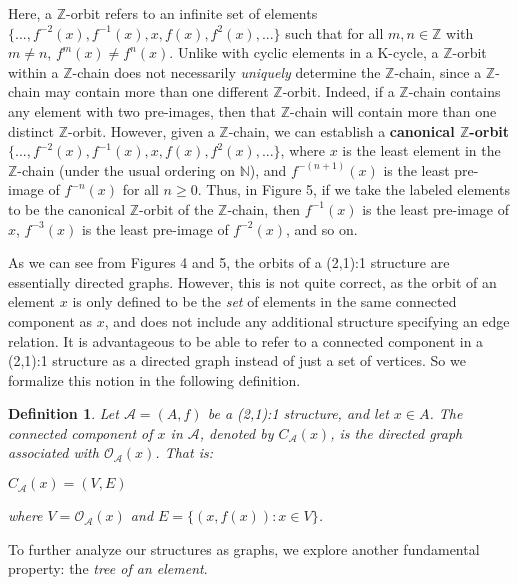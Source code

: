 \documentclass[12pt]{article}
\newtheorem{dfn}[thm]{Definition}
\begin{document}
Here, a $\mathbb{Z}$-orbit refers to an infinite set of elements $\{..., f^{-2}(x), f^{-1}(x), x, f(x), f^2(x),...\}$ such that for all $m,n \in \mathbb{Z}$ with $m \not= n$, $f^m(x) \not= f^n(x)$. Unlike with cyclic elements in a K-cycle, a $\mathbb{Z}$-orbit within a $\mathbb{Z}$-chain does not necessarily \emph{uniquely} determine the $\mathbb{Z}$-chain, since a $\mathbb{Z}$-chain may contain more than one different $\mathbb{Z}$-orbit. Indeed, if a $\mathbb{Z}$-chain contains any element with two pre-images, then that $\mathbb{Z}$-chain will contain more than one distinct $\mathbb{Z}$-orbit. However, given a $\mathbb{Z}$-chain, we can establish a \textbf{canonical $\mathbb{Z}$-orbit} $\{..., f^{-2}(x), f^{-1}(x), x, f(x), f^2(x),...\}$, where $x$ is the least element in the $\mathbb{Z}$-chain (under the usual ordering on $\mathbb{N}$), and $f^{-(n+1)}(x)$ is the least pre-image of $f^{-n}(x)$ for all $n \geq 0$. Thus, in Figure 5, if we take the labeled elements to be the canonical $\mathbb{Z}$-orbit of the $\mathbb{Z}$-chain, then $f^{-1}(x)$ is the least pre-image of $x$, $f^{-3}(x)$ is the least pre-image of $f^{-2}(x)$, and so on.

As we can see from Figures 4 and 5, the orbits of a (2,1):1 structure are essentially directed graphs. However, this is not quite correct, as the orbit of an element $x$ is only defined to be the \emph{set} of elements in the same connected component as $x$, and does not include any additional structure specifying an edge relation. It is advantageous to be able to refer to a connected component in a (2,1):1 structure as a directed graph instead of just a set of vertices. So we formalize this notion in the following definition.

\begin{dfn}
Let $\mathcal{A} = (A,f)$ be a (2,1):1 structure, and let $x \in A$. The \emph{connected component of $x$ in $\mathcal{A}$}, denoted by $C_{\mathcal{A}}(x)$, is the directed graph associated with $\mathcal{O}_{\mathcal{A}} (x)$. That is:

\begin{center}
$C_{\mathcal{A}}(x) = (V,E)$
\end{center}

where $V = \mathcal{O}_{\mathcal{A}} (x)$ and $E = \{(x, f(x)): x \in V\}$.
\end{dfn}

To further analyze our structures as graphs, we explore another fundamental property: the \emph{tree of an element}. 
\end{document}
